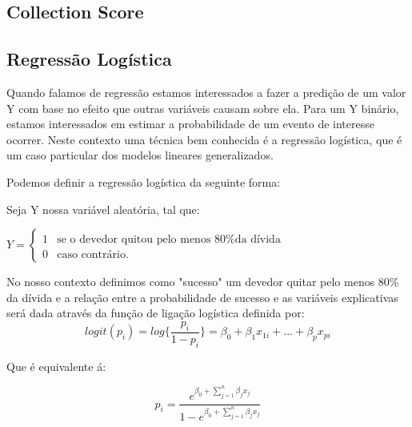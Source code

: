 \documentclass[12pt,a4paper]{article}
\begin{document}
\subsection{Collection Score}

\subsection{Regressão Logística}

Quando falamos de regressão estamos interessados a fazer a predição de um valor Y com base no efeito que outras variáveis causam sobre ela. Para um Y binário, estamos interessados em estimar a probabilidade de um evento de interesse  ocorrer. Neste contexto uma técnica bem conhecida é a regressão logística, que é um caso particular dos modelos lineares generalizados.

Podemos definir a regressão logística da seguinte forma:


Seja Y nossa variável aleatória, tal que:

\enspace

$
Y = 
\begin{cases}

             1 & \mbox{se o devedor quitou pelo menos 80\% da dívida}\\

             0 & \mbox{caso contrário.}

       \end{cases}
$

\hspace{2cm}

No nosso contexto definimos como "sucesso" um devedor quitar pelo menos 80\% da dívida e a relação entre a probabilidade de sucesso  e as variáveis explicativas será dada através da função de ligação logística definida por:
\begin{equation}\label{eq:logit}
 logit(p_i) = log\{\frac{p_i}{1 - p_i}\} = \beta_0 + \beta_1 x_{1i} + ... + \beta_p x_{pi} 
\end{equation}

Que é equivalente á:

\begin{equation}\label{eq:te}
 p_i = \frac{e^{\beta_0 + \sum\limits_{j=1}^{n} \beta_j x_j}}
 {1 - e^{\beta_0 + \sum\limits_{j=1}^{n} \beta_j x_j}} 
\end{equation}
\end{document}
